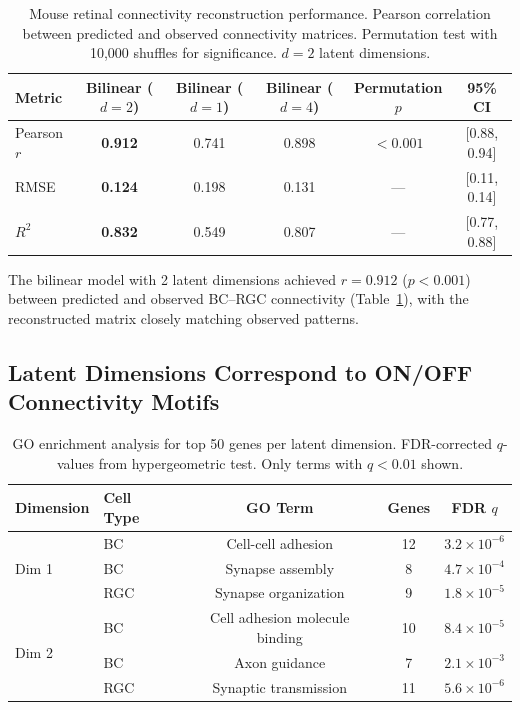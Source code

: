 \documentclass[11pt]{article}
\begin{document}
\begin{table}[H]
\centering
\caption{Mouse retinal connectivity reconstruction performance. Pearson correlation between predicted and observed connectivity matrices. Permutation test with 10,000 shuffles for significance. $d = 2$ latent dimensions.}
\label{tab:retina_perf}
\begin{tabular}{lccccc}
\toprule
Metric & Bilinear ($d=2$) & Bilinear ($d=1$) & Bilinear ($d=4$) & Permutation $p$ & 95\% CI \\
\midrule
Pearson $r$ & \textbf{0.912} & 0.741 & 0.898 & $< 0.001$ & [0.88, 0.94] \\
RMSE & \textbf{0.124} & 0.198 & 0.131 & --- & [0.11, 0.14] \\
$R^2$ & \textbf{0.832} & 0.549 & 0.807 & --- & [0.77, 0.88] \\
\bottomrule
\end{tabular}
\end{table}

The bilinear model with 2 latent dimensions achieved $r = 0.912$ ($p < 0.001$) between predicted and observed BC--RGC connectivity (Table~\ref{tab:retina_perf}), with the reconstructed matrix closely matching observed patterns.

\subsection{Latent Dimensions Correspond to ON/OFF Connectivity Motifs}

\begin{table}[H]
\centering
\caption{GO enrichment analysis for top 50 genes per latent dimension. FDR-corrected $q$-values from hypergeometric test. Only terms with $q < 0.01$ shown.}
\label{tab:go}
\begin{tabular}{llccc}
\toprule
Dimension & Cell Type & GO Term & Genes & FDR $q$ \\
\midrule
\multirow{3}{*}{Dim 1} & BC & Cell-cell adhesion & 12 & $3.2 \times 10^{-6}$ \\
 & BC & Synapse assembly & 8 & $4.7 \times 10^{-4}$ \\
 & RGC & Synapse organization & 9 & $1.8 \times 10^{-5}$ \\
\midrule
\multirow{3}{*}{Dim 2} & BC & Cell adhesion molecule binding & 10 & $8.4 \times 10^{-5}$ \\
 & BC & Axon guidance & 7 & $2.1 \times 10^{-3}$ \\
 & RGC & Synaptic transmission & 11 & $5.6 \times 10^{-6}$ \\
\bottomrule
\end{tabular}
\end{table}
\end{document}
